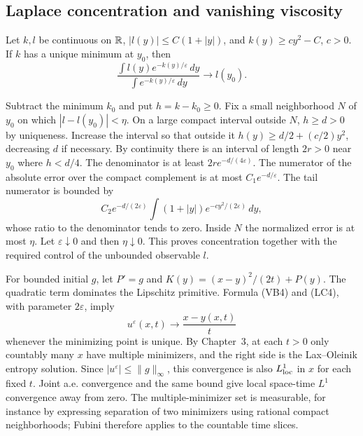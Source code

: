 \subsection{Laplace concentration and vanishing viscosity}\label{sec:4-laplace}
\begin{lemma}
Let $k,l$ be continuous on $\mathbb{R}$, $|l(y)|\leq C(1+|y|)$,
and $k(y)\geq c y^2-C$, $c>0$.
If $k$ has a unique minimum at $y_0$, then
\[
 \frac{\int l(y)e^{-k(y)/\varepsilon}\,dy}
      {\int e^{-k(y)/\varepsilon}\,dy}\longrightarrow l(y_0).
 \tag{LC4}
\]
\end{lemma}
\begin{expandedproof}
Subtract the minimum $k_0$ and put $h=k-k_0\geq0$.
Fix a small neighborhood $N$ of $y_0$ on which
$|l-l(y_0)|<\eta$.
On a large compact interval outside $N$, $h\geq d>0$ by uniqueness.
Increase the interval so that outside it
$h(y)\geq d/2+(c/2)y^2$, decreasing $d$ if necessary.
By continuity there is an interval of length $2r>0$ near $y_0$
where $h<d/4$.
The denominator is at least $2r e^{-d/(4\varepsilon)}$.
The numerator of the absolute error over the compact complement
is at most $C_1e^{-d/\varepsilon}$.
The tail numerator is bounded by
\[
 C_2e^{-d/(2\varepsilon)}
       \int(1+|y|)e^{-cy^2/(2\varepsilon)}\,dy,
\]
whose ratio to the denominator tends to zero.
Inside $N$ the normalized error is at most $\eta$.
Let $\varepsilon\downarrow0$ and then $\eta\downarrow0$.
This proves concentration together with the required control of
the unbounded observable $l$.
\end{expandedproof}
\Needspace{45mm}

For bounded initial $g$, let $P'=g$ and
$K(y)=(x-y)^2/(2t)+P(y)$.
The quadratic term dominates the Lipschitz primitive.
Formula (VB4) and (LC4), with parameter $2\varepsilon$, imply
\[
 u^\varepsilon(x,t)\longrightarrow \frac{x-y(x,t)}t
\]
whenever the minimizing point is unique.
By Chapter~3, at each $t>0$ only countably many $x$ have multiple
minimizers, and the right side is the Lax--Oleinik entropy solution.
Since $|u^\varepsilon|\leq\|g\|_\infty$, this convergence is also
$L^1_{\rm loc}$ in $x$ for each fixed $t$.
Joint a.e. convergence and the same bound give local space-time
$L^1$ convergence away from zero.
The multiple-minimizer set is measurable, for instance by expressing
separation of two minimizers using rational compact neighborhoods;
Fubini therefore applies to the countable time slices.
\Needspace{45mm}

